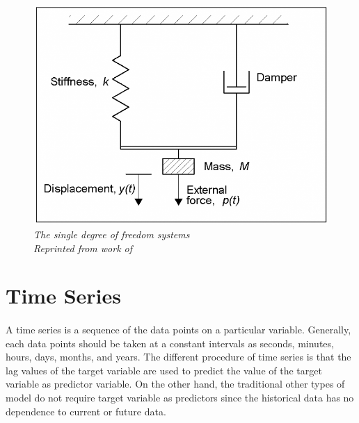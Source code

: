 \begin{figure}[H]
  \centering
  \caption[The single degree of freedom systems]{\emph{The single degree of freedom systems \\
  Reprinted from work of \citeauthor{steelconstruction_2016} \citeyear{steelconstruction_2016}}  }\label{fig:s_degree}
  \includegraphics[scale = 0.4]{figures/single_degree.png}  
\end{figure}

\section{Time Series}
\paragraph{}
A time series is a sequence of the data points on a particular variable. Generally, each data points should be taken at a constant intervals as seconds, minutes, hours, days, months, and years.  The different procedure of time series is that the lag values of the target variable are used to predict the value of the target variable as predictor variable. On the other hand, the traditional other types of model do not require target variable as predictors since the historical data has no dependence to current or future data. 


